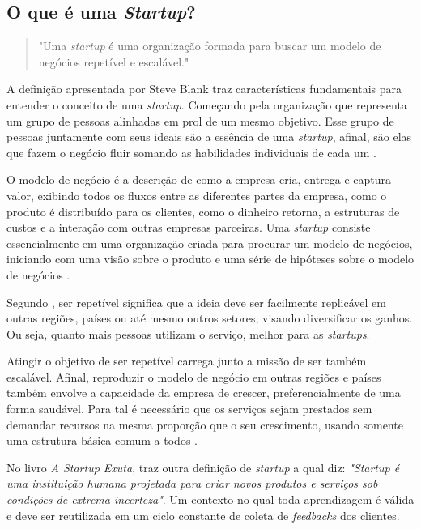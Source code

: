 \subsection[OQueEStartup]{O que é uma \textit{Startup}?}
\label{sec:OQueEUmaStartup}

  \begin{quotation}
  "Uma \textit{startup} é uma organização formada para buscar um modelo de 
  negócios repetível e escalável." \cite{SteveBlankFirstPrinciples}
  \end{quotation}

A definição apresentada por Steve Blank traz características
fundamentais para entender o conceito de uma \textit{startup}. Começando
pela organização que representa um grupo de pessoas alinhadas em prol
de um mesmo objetivo. Esse grupo de pessoas juntamente com seus ideais
são a essência de uma \textit{startup}, afinal, são elas que fazem
o negócio fluir somando as habilidades individuais de cada um
\cite{ARevolucaoDasStartups}.

O modelo de negócio é a descrição de como a empresa cria, entrega e captura
valor, exibindo todos os fluxos entre as diferentes partes da empresa,
como o produto é distribuído para os clientes, como o dinheiro retorna, a
estruturas de custos e a interação com outras empresas parceiras. Uma
\textit{startup} consiste essencialmente em uma organização criada para
procurar um modelo de negócios, iniciando com uma visão sobre o produto e
uma série de hipóteses sobre o modelo de negócios
\cite{SteveBlankFirstPrinciples}.

Segundo , ser repetível significa que 
a ideia deve ser facilmente replicável em outras regiões, países ou até
mesmo outros setores, visando diversificar os ganhos. Ou seja, quanto mais
pessoas utilizam o serviço, melhor para as \textit{startups}.

Atingir o objetivo de ser repetível carrega junto a missão de ser também
escalável. Afinal, reproduzir o modelo de negócio em outras regiões e países
também envolve a capacidade da empresa de crescer, preferencialmente de uma
forma saudável. Para tal é necessário que os serviços sejam prestados sem
demandar recursos na mesma proporção que o seu crescimento, usando somente 
uma estrutura básica comum a todos \cite{CassioSpina}.

No livro \textit{A Startup Exuta},  traz outra
definição de \textit{startup} a qual diz: \textit{"Startup é uma instituição
humana projetada para criar novos produtos e serviços sob condições de extrema
incerteza"}. Um contexto no qual toda aprendizagem é válida e deve ser
reutilizada em um ciclo constante de coleta de \textit{feedbacks} dos clientes.

